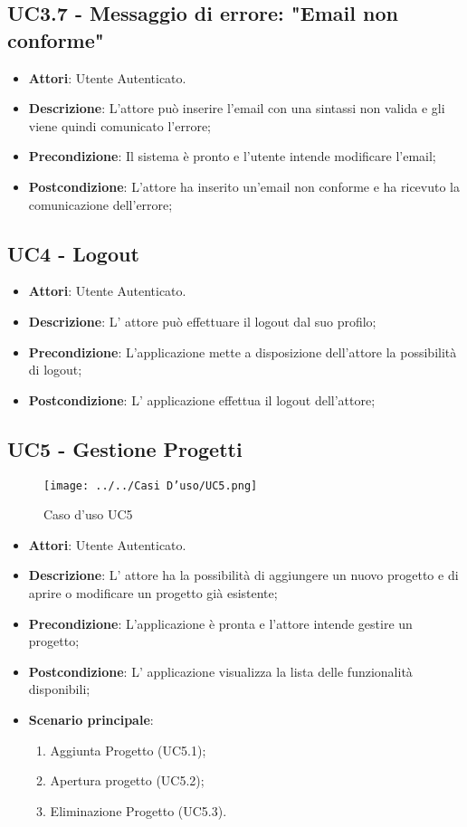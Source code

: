 \subsection{UC3.7 - Messaggio di errore: "Email non conforme"} 
\label{ssec:UC3.7} 
\begin{itemize} 
\item \textbf{Attori}: Utente Autenticato.
\item \textbf{Descrizione}: L'attore può inserire l'email con una sintassi non valida e gli viene quindi comunicato l'errore;
\item \textbf{Precondizione}: Il sistema è pronto e l'utente intende modificare l'email;
\item \textbf{Postcondizione}: L'attore ha inserito un'email non conforme e ha ricevuto la comunicazione dell'errore;
\end{itemize} 
\subsection{UC4 - Logout} 
\label{ssec:UC4} 
\begin{itemize} 
\item \textbf{Attori}: Utente Autenticato.
\item \textbf{Descrizione}: L' attore può effettuare il logout dal suo profilo;
\item \textbf{Precondizione}: L’applicazione mette a disposizione dell’attore la possibilità di logout;
\item \textbf{Postcondizione}: L' applicazione effettua il logout dell'attore;
\end{itemize} 
\subsection{UC5 - Gestione Progetti} 
\label{ssec:UC5} 
\begin{figure}[h!] 
\centering 
\texttt{[image: ../../Casi D'uso/UC5.png]} 
\caption{Caso d'uso UC5} 
 \end{figure} 
\begin{itemize} 
\item \textbf{Attori}: Utente Autenticato.
\item \textbf{Descrizione}: L’ attore ha la possibilità di aggiungere un nuovo progetto e di aprire o modificare un progetto già esistente;
\item \textbf{Precondizione}: L'applicazione è pronta e l'attore intende gestire un progetto;
\item \textbf{Postcondizione}: L’ applicazione visualizza la lista delle funzionalità disponibili;
\item \textbf{Scenario principale}: \begin{enumerate}\item Aggiunta Progetto (UC5.1);\item Apertura progetto (UC5.2);\item Eliminazione Progetto (UC5.3). 
 \end{enumerate}
\end{itemize} 
